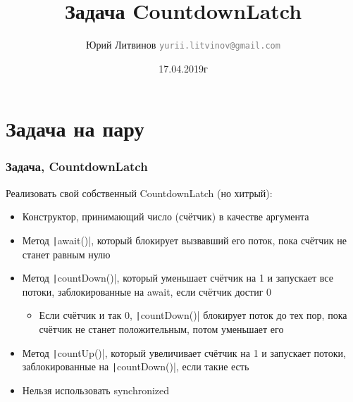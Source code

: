 \documentclass[xetex,mathserif,serif]{beamer}
\title{Задача CountdownLatch}
\author[Юрий Литвинов]{Юрий Литвинов \newline \textcolor{gray}{\small\texttt{yurii.litvinov@gmail.com}}}
\date{17.04.2019г}
\begin{document}
	
	\frame{\titlepage}
	
	\section{Задача на пару}

	\begin{frame}
		\frametitle{Задача, CountdownLatch}
		Реализовать свой собственный CountdownLatch (но хитрый):
		\begin{itemize}
			\item Конструктор, принимающий число (счётчик) в качестве аргумента
			\item Метод \texttt|await()|, который блокирует вызвавший его поток, пока счётчик не станет равным нулю
			\item Метод \texttt|countDown()|, который уменьшает счётчик на 1 и запускает все потоки, заблокированные на await, если счётчик достиг 0
			\begin{itemize}
				\item Если счётчик и так 0, \texttt|countDown()| блокирует поток до тех пор, пока счётчик не станет положительным, потом уменьшает его
			\end{itemize}
			\item Метод \texttt|countUp()|, который увеличивает счётчик на 1 и запускает потоки, заблокированные на \texttt|countDown()|, если такие есть
			\item Нельзя использовать synchronized
		\end{itemize}
	\end{frame}
\end{document}
